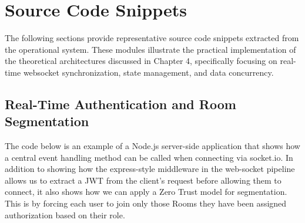 \chapter{Source Code Snippets}
\label{app:code_snippets}

The following sections provide representative source code snippets extracted from the operational system. These modules illustrate the practical implementation of the theoretical architectures discussed in Chapter 4, specifically focusing on real-time websocket synchronization, state management, and data concurrency.

\section{Real-Time Authentication and Room Segmentation}
\label{sec:code_socket_auth}

The code below is an example of a Node.js server-side application that shows how a central event handling method can be called when connecting via socket.io. In addition to showing how the express-style middleware in the web-socket pipeline allows us to extract a JWT from the client's request before allowing them to connect, it also shows how we can apply a Zero Trust model for segmentation. This is by forcing each user to join only those Rooms they have been assigned authorization based on their role.


